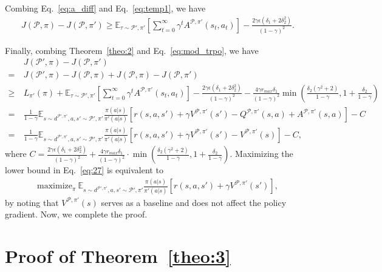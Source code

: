\documentclass[letterpaper]{article} %
\def\E{{\mathbb{E}}}
\def\P{{\mathcal{P}}}
\begin{document}
Combing Eq.~\eqref{eq:a_diff} and Eq.~\eqref{eq:temp1}, we have
{\small
\begin{align}
J(\P,\pi)-J(\P,\pi')\geq
\E_{\tau\sim\P',\pi'}\left[\sum_{t=0}^{\infty}\gamma^t A^{\P,\pi'}(s_t,a_t)\right]
-\frac{2\gamma\epsilon(\delta_1+2\delta_2^2)}{(1-\gamma)^2}.
\label{eq:mod_trpo}
\end{align}
}\noindent

Finally, combing Theorem~\ref{theo:2} and Eq.~\eqref{eq:mod_trpo}, we have
{\small
\begin{align}
&J(\P',\pi)-J(\P,\pi')
\nonumber
\\
=\ 
&J(\P',\pi)-J(\P,\pi)+J(\P,\pi)-J(\P,\pi')
\nonumber
\\
\geq\ 
&L_{\pi'}(\pi)+
\E_{\tau\sim\P',\pi'}
\left[
\sum_{t=0}^\infty\gamma^t A^{\P,\pi'}(s_t,a_t)
\right]-
\frac{2\gamma\epsilon(\delta_1+2\delta_2^2)}{(1-\gamma)^2}-
\frac{4\gamma r_{max}\delta_1}{(1-\gamma)^2}
\min\left(
\frac{\delta_2(\gamma^2+2)}{1-\gamma}, 1+\frac{\delta_2}{1-\gamma}
\right)
\nonumber
\\
=\ 
&\frac{1}{1-\gamma}\E_{s\sim d^{\P',\pi'} ,a,s'\sim\P',\pi'}\frac{\pi(a|s)}{\pi'(a|s)}
[r(s,a,s')+\gamma V^{\P,\pi'}(s')-Q^{\P,\pi'}(s,a)+A^{\P,\pi'}(s,a)]-C
\nonumber
\\
=\ 
&\frac{1}{1-\gamma}\E_{s\sim d^{\P',\pi'} ,a,s'\sim\P',\pi'}\frac{\pi(a|s)}{\pi'(a|s)}
[r(s,a,s')+\gamma V^{\P,\pi'}(s')-V^{\P,\pi'}(s)]-C,
\label{eq:27}
\end{align}
}\noindent
where 
$C=\frac{2\gamma\epsilon(\delta_1+2\delta_2^2)}{(1-\gamma)^2}
+
\frac{4\gamma r_{max}\delta_1}{(1-\gamma)^2}
\cdot\min\left(
\frac{\delta_2(\gamma^2+2)}{1-\gamma}, 1+\frac{\delta_2}{1-\gamma}
\right)$. 
Maximizing the lower bound in Eq.~\eqref{eq:27} is equivalent to
\begin{align}
\text{maximize}_{\pi}\ 
\E_{s\sim d^{\P',\pi'} ,a,s'\sim\P',\pi'}\frac{\pi(a|s)}{\pi'(a|s)}
\left[r(s,a,s')+\gamma V^{\P,\pi'}(s')\right],
\end{align}
by noting that $V^{\P,\pi'}(s)$ serves as a baseline and does not affect the policy gradient.
Now, we complete the proof.

\rightline{$\Box$}





\section{Proof of Theorem~\ref{theo:3}}
\label{sec:proof_theorem_rto}
\proof
\end{document}
